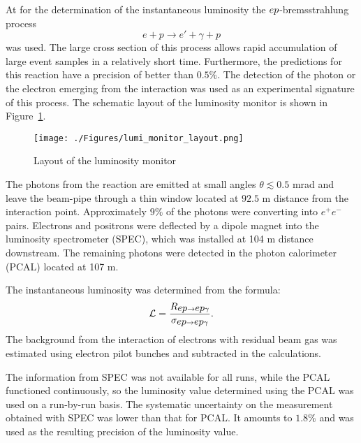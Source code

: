 At \zeus for the determination of the instantaneous luminosity the $\mbox{$e p$}$-bremsstrahlung process 
\begin{equation}
	e + p \rightarrow e' + \gamma + p
\end{equation}
was used. The large cross section of this process allows rapid accumulation of large event samples in a relatively short time. Furthermore, the predictions for this reaction have a precision of better than $0.5\%$. The detection of the photon or the electron emerging from the interaction was used as an experimental signature of this process. The schematic layout of the luminosity monitor is shown in Figure~\ref{fig:lumi_monitor_layout}.
\begin{figure}
	\centering
		\texttt{[image: ./Figures/lumi\_monitor\_layout.png]}
	\caption{Layout of the \zeus luminosity monitor}
	\label{fig:lumi_monitor_layout}
\end{figure}
The photons from the reaction are emitted at small angles $\theta \lesssim 0.5$ mrad and leave the beam-pipe through a thin window located at $92.5$ m distance from the interaction point. Approximately $9\%$ of the photons were converting into $e^+e^-$ pairs. Electrons and positrons were deflected by a dipole magnet into the luminosity spectrometer (SPEC), which was installed at 104 m distance downstream. The remaining photons were detected in the photon calorimeter (PCAL) located at 107 m.

The instantaneous luminosity was determined from the formula:
\begin{equation}
\mathcal{L} = \frac{R_{\mbox{$e p$}\rightarrow \mbox{$e p$}\gamma}}{ \sigma_{\mbox{$e p$}\rightarrow \mbox{$e p$}\gamma}}.
\end{equation}
The background from the interaction of electrons with residual beam gas was estimated using electron pilot bunches and subtracted in the calculations.

The information from SPEC was not available for all runs, while the PCAL functioned continuously, so the luminosity value determined using the PCAL was used on a run-by-run basis. The systematic uncertainty on the measurement obtained with SPEC was lower than that for PCAL. It amounts to $1.8\%$ and was used as the resulting precision of the luminosity value.


